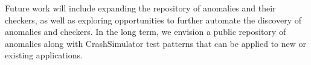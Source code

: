 
Future work will include expanding the repository of anomalies and their
checkers, as well as exploring opportunities to further automate the
discovery of anomalies and checkers.  In the long term, we envision a
public repository of anomalies along with CrashSimulator test patterns that
can be applied to new or existing applications.
